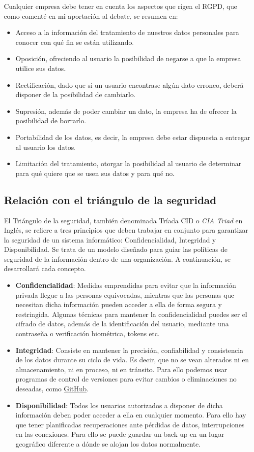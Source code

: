 \documentclass{article}
\begin{document}
Cualquier empresa debe tener en cuenta los aspectos que rigen el RGPD, que como comenté en mi aportación al debate, se resumen en:
\begin{itemize}
\item  Acceso a la información del tratamiento de nuestros datos personales para conocer con qué fin se están utilizando.
\item Oposición, ofreciendo al usuario la posibilidad de negarse a que la empresa utilice sus datos.
\item Rectificación, dado que si un usuario encontrase algún dato erroneo, deberá disponer de la posibilidad de cambiarlo.
\item Supresión, además de poder cambiar un dato, la empresa ha de ofrecer la posibilidad de borrarlo.
\item Portabilidad de los datos, es decir, la empresa debe estar dispuesta a entregar al usuario los datos.
\item Limitación del tratamiento, otorgar la posibilidad al usuario de determinar para qué quiere que se usen sus datos y para qué no.
\end{itemize}

\subsection{Relación con el triángulo de la seguridad}
El Triángulo de la seguridad, también denominada Tríada CID o \textit{CIA Triad} en Inglés, se refiere a tres principios que deben trabajar en conjunto para garantizar la seguridad de un sistema informático: Confidencialidad, Integridad y Disponibilidad. Se trata de un modelo diseñado para guiar las políticas de seguridad de la información dentro de una organización. A continuación, se desarrollará cada concepto.
\begin{itemize}
\item \textbf{Confidencialidad}: Medidas emprendidas para evitar que la información privada llegue a las personas equivocadas, mientras que las personas que necesitan dicha información pueden acceder a ella de forma segura y restringida. Algunas técnicas para mantener la confidencialidad puedes ser el cifrado de datos, además de la identificación del usuario, mediante una contraseña o verificación biométrica, tokens etc.
\item \textbf{Integridad}: Consiste en mantener la precisión, confiabilidad y consistencia de los datos durante su ciclo de vida. Es decir, que no se vean alterados ni en almacenamiento, ni en proceso, ni en tránsito. Para ello podemos usar programas de control de versiones para evitar cambios o eliminaciones no deseadas, como \href{https://github.com/}{GitHub}.
\item \textbf{Disponibilidad}: Todos los usuarios autorizados a disponer de dicha información deben poder acceder a ella en cualquier momento. Para ello hay que tener planificadas recuperaciones ante pérdidas de datos, interrupciones en las conexiones. Para ello se puede guardar un back-up en un lugar geográfico diferente a dónde se alojan los datos normalmente.
\end{itemize}
\end{document}
